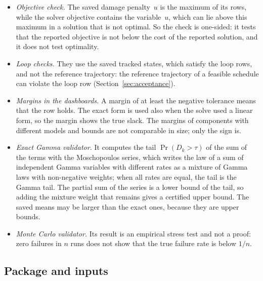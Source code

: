 \documentclass[11pt,a4paper]{article}
\theoremstyle{plain}
\theoremstyle{definition}
\theoremstyle{remark}
\begin{document}
\begin{itemize}[nosep]
  \item \emph{Objective check.} The saved damage penalty~$u$ is the maximum of its rows, while the solver objective contains the variable~$u$, which can lie above this maximum in a solution that is not optimal.
    So the check is one-sided: it tests that the reported objective is not below the cost of the reported solution, and it does not test optimality.
  \item \emph{Loop checks.} They use the saved tracked states, which satisfy the loop rows, and not the reference trajectory: the reference trajectory of a feasible schedule can violate the loop row (Section~\ref{sec:acceptance}).
  \item \emph{Margins in the dashboards.} A margin of at least the negative tolerance means that the row holds.
    The exact form is used also when the solve used a linear form, so the margin shows the true slack.
    The margins of components with different models and bounds are not comparable in size; only the sign is.
  \item \emph{Exact Gamma validator.} It computes the tail $\Pr(D_k > \tau)$ of the sum of the terms with the Moschopoulos series, which writes the law of a sum of independent Gamma variables with different rates as a mixture of Gamma laws with non-negative weights; when all rates are equal, the tail is the Gamma tail.
    The partial sum of the series is a lower bound of the tail, so adding the mixture weight that remains gives a certified upper bound.
    The saved means may be larger than the exact ones, because they are upper bounds.
  \item \emph{Monte Carlo validator.} Its result is an empirical stress test and not a proof: zero failures in $n$ runs does not show that the true failure rate is below $1/n$.
\end{itemize}

\subsection{Package and inputs}
\label{sec:impl_package}
\end{document}
